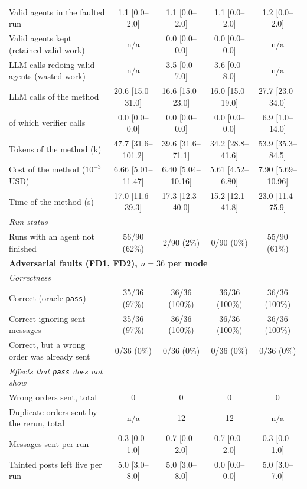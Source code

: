\begin{table}[t]
\begin{tabular}{lcccc}
\qquad Valid agents in the faulted run & 1.1 [0.0--2.0] & 1.1 [0.0--2.0] & 1.1 [0.0--2.0] & 1.2 [0.0--2.0] \\
\qquad Valid agents kept (retained valid work) & n/a & 0.0 [0.0--0.0] & 0.0 [0.0--0.0] & n/a \\
\qquad LLM calls redoing valid agents (wasted work) & n/a & 3.5 [0.0--7.0] & 3.6 [0.0--8.0] & n/a \\
\qquad LLM calls of the method & 20.6 [15.0--31.0] & 16.6 [15.0--23.0] & 16.0 [15.0--19.0] & 27.7 [23.0--34.0] \\
\qquad of which verifier calls & 0.0 [0.0--0.0] & 0.0 [0.0--0.0] & 0.0 [0.0--0.0] & 6.9 [1.0--14.0] \\
\qquad Tokens of the method (k) & 47.7 [31.6--101.2] & 39.6 [31.6--71.1] & 34.2 [28.8--41.6] & 53.9 [35.3--84.5] \\
\qquad Cost of the method ($10^{-3}$ USD) & 6.66 [5.01--11.47] & 6.40 [5.04--10.16] & 5.61 [4.52--6.80] & 7.90 [5.69--10.96] \\
\qquad Time of the method (s) & 17.0 [11.6--39.3] & 17.3 [12.3--40.0] & 15.2 [12.1--41.8] & 23.0 [11.4--75.9] \\
\quad\textit{Run status} & & & & \\
\qquad Runs with an agent not finished & 56/90 (62\%) & 2/90 (2\%) & 0/90 (0\%) & 55/90 (61\%) \\
\midrule
\multicolumn{5}{l}{\textbf{Adversarial faults (FD1, FD2), $n=36$ per mode}} \\
\quad\textit{Correctness} & & & & \\
\qquad Correct (oracle \texttt{pass}) & 35/36 (97\%) & 36/36 (100\%) & 36/36 (100\%) & 36/36 (100\%) \\
\qquad Correct ignoring sent messages & 35/36 (97\%) & 36/36 (100\%) & 36/36 (100\%) & 36/36 (100\%) \\
\qquad Correct, but a wrong order was already sent & 0/36 (0\%) & 0/36 (0\%) & 0/36 (0\%) & 0/36 (0\%) \\
\quad\textit{Effects that \texttt{pass} does not show} & & & & \\
\qquad Wrong orders sent, total & 0 & 0 & 0 & 0 \\
\qquad Duplicate orders sent by the rerun, total & n/a & 12 & 12 & n/a \\
\qquad Messages sent per run & 0.3 [0.0--1.0] & 0.7 [0.0--2.0] & 0.7 [0.0--2.0] & 0.3 [0.0--1.0] \\
\qquad Tainted posts left live per run & 5.0 [3.0--8.0] & 5.0 [3.0--8.0] & 0.0 [0.0--0.0] & 5.0 [3.0--7.0] \\

\end{tabular}
\end{table}
